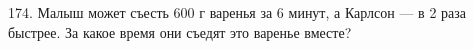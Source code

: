 174. Малыш может съесть 600 г варенья за 6 минут, а Карлсон --- в 2 раза быстрее. За какое время они съедят это варенье вместе?\\
